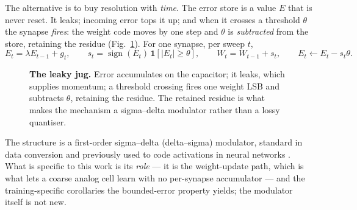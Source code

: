 \documentclass[11pt]{article}
\begin{document}
The alternative is to buy resolution with \emph{time}. The error store
is a value \(E\) that is never reset. It leaks; incoming error tops it
up; and when it crosses a threshold \(\theta\) the synapse \emph{fires}:
the weight code moves by one step and \(\theta\) is \emph{subtracted}
from the store, retaining the residue (Fig.~\ref{fig:jug}). For one synapse, per
sweep \(t\), \begin{equation}
E_t = \lambda E_{t-1} + g_t, \qquad
s_t = \operatorname{sign}(E_t)\,\mathbf{1}\!\left[|E_t| \ge \theta\right], \qquad
W_t = W_{t-1} + s_t, \qquad
E_t \leftarrow E_t - s_t\theta .
\label{eq:jug}
\end{equation}

\begin{figure}[t]
\centering
{}
\caption{\textbf{The leaky jug.} Error accumulates on the capacitor; it leaks, which supplies
momentum; a threshold crossing fires one weight LSB and subtracts $\theta$, retaining the residue.
The retained residue is what makes the mechanism a sigma--delta modulator rather than a lossy
quantiser.}
\label{fig:jug}
\end{figure}

The structure is a first-order sigma--delta (delta--sigma) modulator,
standard in data conversion and previously used to code activations in
neural networks \cite{oconnor2017sigma}. What is specific to this work
is its \emph{role} --- it is the weight-update path, which is what lets
a coarse analog cell learn with no per-synapse accumulator --- and the
training-specific corollaries the bounded-error property yields; the
modulator itself is not new.
\end{document}

